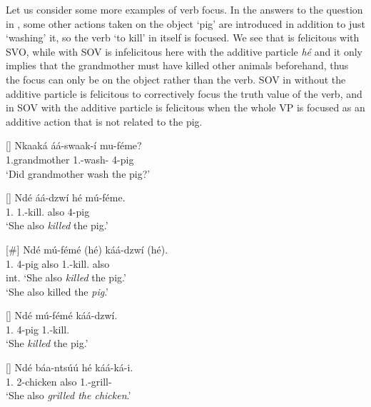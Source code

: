 \documentclass[output=paper,colorlinks,citecolor=brown,
]{langscibook}
\begin{document}
Let us consider some more examples of verb focus. In the answers to the question in , some other actions taken on the object `pig' are introduced in addition to just `washing' it, so the verb `to kill' in  itself is focused. We see that  is felicitous with SVO, while  with SOV is infelicitous here with the additive particle \textit{hé} and it only implies that the grandmother must have killed other animals beforehand, thus the focus can only be on the object rather than the verb. SOV in  without the additive particle is felicitous to correctively focus the truth value of the verb, and in  SOV with the additive particle is felicitous when the whole VP is focused as an additive action that is not related to the pig.
\begin{exe}
     \ex \label{51}
    \begin{xlist}
\ex
[]{
\label{51a}
\gll
Nkaaká áá-swaak-í mu-féme?\\
1.grandmother 1\Sm{}.\Pst{}-wash-\Pst{} 4-pig\\
\trans ‘Did grandmother wash the pig?’
}

\ex
[]{
\label{51b}
\gll
Ndé áá-dzwí hé mú-féme.\\
1.\Pro{} 1\Sm{}.\Pst{}-kill.\Pst{} also 4-pig\\
\trans ‘She also \textit{killed} the pig.’
}

\ex
[\#]{
\label{51c}
\gll
Ndé mú-fémé (hé) káá-dzwí (hé).\\
1.\Pro{} 4-pig also 1\Sm{}.\Pst{}-kill.\Pst{} {\db}also\\
\trans int. ‘She also \textit{killed} the pig.’\\‘She also killed the \textit{pig}.’
}

\ex
[]{
\label{51d}
\gll
Ndé mú-fémé káá-dzwí.\\
1.\Pro{} 4-pig 1\Sm{}.\Pst{}-kill.\Pst{}\\
\trans ‘She \textit{killed} the pig.’
}

\ex
[]{
\label{51e}
\gll
Ndé báa-ntsúú hé káá-ká-i.\\
1.\Pro{} 2-chicken also 1\Sm{}.\Pst{}-grill-\Pst{}\\
\trans  ‘She also \textit{grilled the chicken}.’
}

    \end{xlist}
\end{exe}
\end{document}
